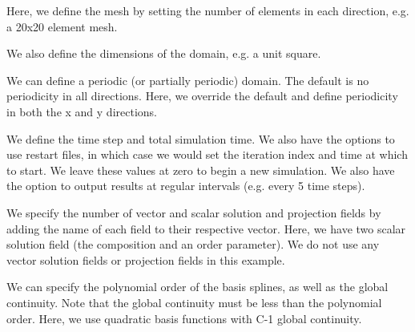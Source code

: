 \begin{DoxyCodeInclude}

\end{DoxyCodeInclude}


Here, we define the mesh by setting the number of elements in each direction, e.\-g. a 20x20 element mesh.


\begin{DoxyCodeInclude}

\end{DoxyCodeInclude}


We also define the dimensions of the domain, e.\-g. a unit square.


\begin{DoxyCodeInclude}

\end{DoxyCodeInclude}


We can define a periodic (or partially periodic) domain. The default is no periodicity in all directions. Here, we override the default and define periodicity in both the x and y directions.


\begin{DoxyCodeInclude}

\end{DoxyCodeInclude}


We define the time step and total simulation time. We also have the options to use restart files, in which case we would set the iteration index and time at which to start. We leave these values at zero to begin a new simulation. We also have the option to output results at regular intervals (e.\-g. every 5 time steps).


\begin{DoxyCodeInclude}

\end{DoxyCodeInclude}


We specify the number of vector and scalar solution and projection fields by adding the name of each field to their respective vector. Here, we have two scalar solution field (the composition and an order parameter). We do not use any vector solution fields or projection fields in this example.


\begin{DoxyCodeInclude}

\end{DoxyCodeInclude}


We can specify the polynomial order of the basis splines, as well as the global continuity. Note that the global continuity must be less than the polynomial order. Here, we use quadratic basis functions with C-\/1 global continuity.


